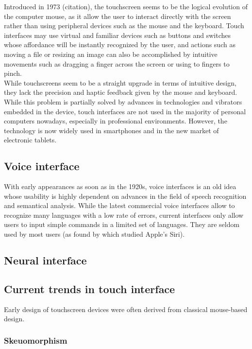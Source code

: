 \documentclass[a4paper,11pt] {article}
\theoremstyle{definition}
\begin{document}
    Introduced in 1973 (citation), the touchscreen seems to be the logical evolution of the computer mouse, as it allow the user to interact directly with the screen rather than using peripheral devices such as the mouse and the keyboard. Touch interfaces may use virtual and familiar devices such as buttons and switches whose affordance will be instantly recognized by the user, and actions such as moving a file or resizing an image can also be accomplished by intuitive movements such as dragging a finger across the screen or using to fingers to pinch.\\

    While touchscreens seem to be a straight upgrade in terms of intuitive design, they lack the precision and haptic feedback given by the mouse and keyboard. While this problem is partially solved by advances in technologies and vibrators embedded in the device, touch interfaces are not used in the majority of personal computers nowadays, especially in professional environments. However, the technology is now widely used in smartphones and in the new market of electronic tablets.

    \subsection{Voice interface}

    With early appearances as soon as in the 1920s, voice interfaces is an old idea whose usability is highly dependent on advances in the field of speech recognition and semantical analysis. While the latest commercial voice interfaces allow to recognize many languages with a low rate of errors, current interfaces only allow users to input simple commands in a limited set of languages. They are seldom used by most users (as found by \cite{SiriNotUsed} which studied Apple's Siri).

    \subsection{Neural interface}



    \subsection{Current trends in touch interface}

    Early design of touchscreen devices were often derived from classical mouse-based design.

        \subsubsection{Skeuomorphism}
\end{document}
